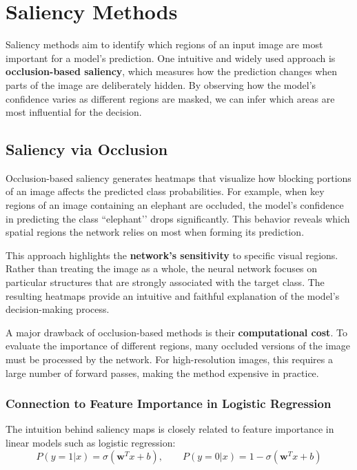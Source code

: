 \documentclass{article}
\begin{document}
\section{Saliency Methods}

Saliency methods aim to identify which regions of an input image are most important for a model’s prediction. One intuitive and widely used approach is \textbf{occlusion-based saliency}, which measures how the prediction changes when parts of the image are deliberately hidden. By observing how the model’s confidence varies as different regions are masked, we can infer which areas are most influential for the decision.

\subsection{Saliency via Occlusion}

Occlusion-based saliency generates heatmaps that visualize how blocking portions of an image affects the predicted class probabilities. For example, when key regions of an image containing an elephant are occluded, the model’s confidence in predicting the class ``elephant’’ drops significantly. This behavior reveals which spatial regions the network relies on most when forming its prediction.

This approach highlights the \textbf{network’s sensitivity} to specific visual regions. Rather than treating the image as a whole, the neural network focuses on particular structures that are strongly associated with the target class. The resulting heatmaps provide an intuitive and faithful explanation of the model’s decision-making process.

A major drawback of occlusion-based methods is their \textbf{computational cost}. To evaluate the importance of different regions, many occluded versions of the image must be processed by the network. For high-resolution images, this requires a large number of forward passes, making the method expensive in practice.

\subsubsection*{Connection to Feature Importance in Logistic Regression}

The intuition behind saliency maps is closely related to feature importance in linear models such as logistic regression:
\[
P(y = 1|x) = \sigma(\mathbf{w}^T x + b), \qquad 
P(y = 0|x) = 1 - \sigma(\mathbf{w}^T x + b)
\]
\end{document}

